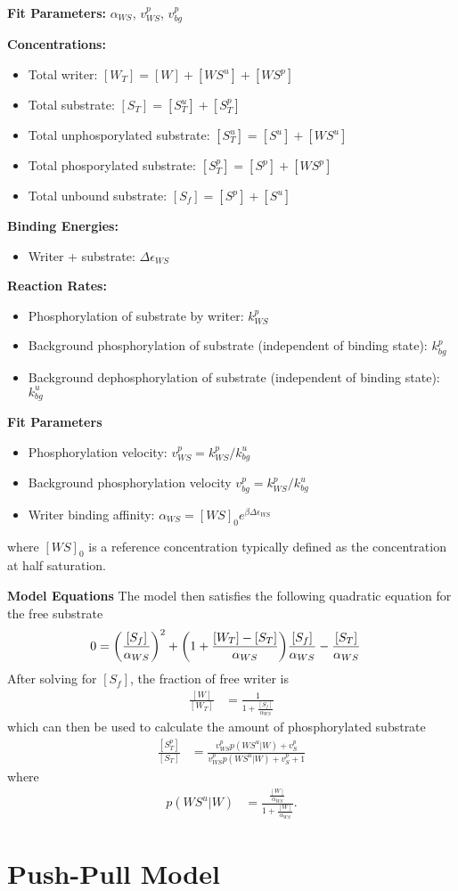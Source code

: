 \documentclass[aps,onecolumn,superscriptaddress,notitlepage]{revtex4-1}
\begin{document}
\textbf{Fit Parameters:} $\alpha_{WS}$, $v_{WS}^p$, $v_{bg}^p$


\textbf{Concentrations:}
\begin{itemize}
\item Total writer: $[W_T] = [W] + [WS^u] + [WS^p]$
\item Total substrate: $[S_T] = [S^u_T] + [S^p_T]$
\item Total unphosporylated substrate: $[S^u_T] = [S^u] + [WS^u]$
\item Total phosporylated substrate: $[S^p_T] = [S^p] + [WS^p]$
\item Total unbound substrate: $[S_f] = [S^p] + [S^u]$
\end{itemize}

\textbf{Binding Energies:}
\begin{itemize}
\item Writer + substrate: $\Delta\epsilon_{WS}$
\end{itemize}

\textbf{Reaction Rates:}
\begin{itemize}
\item Phosphorylation of substrate by writer: $k_{WS}^p$
\item Background phosphorylation of substrate (independent of binding state): $k_{bg}^p$
\item Background dephosphorylation of substrate (independent of binding state): $k_{bg}^u$
\end{itemize}

\textbf{Fit Parameters}
\begin{itemize}
\item Phosphorylation velocity: $v_{WS}^p = k_{WS}^p/k_{bg}^u$
\item Background phosphorylation velocity  $v_{bg}^p = k_{WS}^p/k_{bg}^u$
\item Writer binding affinity: $\alpha_{WS} = [WS]_0e^{\beta \Delta\epsilon_{WS}}$
\end{itemize}
where $[WS]_0$ is a reference concentration typically defined as the concentration at half saturation.

\textbf{Model Equations}
The model then satisfies the following quadratic equation for the free substrate
\begin{align}
0 &= \qty(\frac{[S_f]}{\alpha_{WS}})^2 +  \qty(1+\frac{[W_T]-[S_T]}{\alpha_{WS}})\frac{[S_f]}{\alpha_{WS}} - \frac{[S_T]}{\alpha_{WS}}
\end{align}
After solving for $[S_f]$, the fraction of free writer is
\begin{align}
\frac{[W]}{[W_T]} & = \frac{1}{1 + \frac{[S_f]}{\alpha_{WS}}}
\end{align}
which can then be used to calculate the amount of phosphorylated substrate
\begin{align}
\frac{[S_T^p]}{[S_T]} &= \frac{v_{WS}^p p(WS^u|W) + v_S^p}{v_{WS}^p p(WS^u|W) + v_S^p+1}
\end{align}
where 
\begin{align}
p(WS^u|W) &= \frac{\frac{[W]}{\alpha_{WS}}}{1 + \frac{[W]}{\alpha_{WS}}}.
\end{align}


\section{Push-Pull Model}
\end{document}
